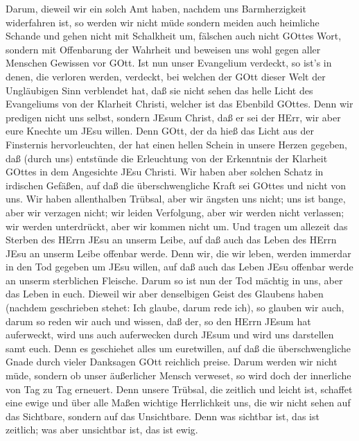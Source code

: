  Darum, dieweil wir ein solch Amt haben, nachdem uns
Barmherzigkeit widerfahren ist, so werden wir nicht müde 
sondern meiden auch heimliche Schande und gehen nicht mit Schalkheit um,
fälschen auch nicht GOttes Wort, sondern mit Offenbarung der Wahrheit
und beweisen uns wohl gegen aller Menschen Gewissen vor GOtt.
 Ist nun unser Evangelium verdeckt, so ist's in denen, die
verloren werden, verdeckt,  bei welchen der GOtt dieser Welt
der Ungläubigen Sinn verblendet hat, daß sie nicht sehen das helle Licht
des Evangeliums von der Klarheit Christi, welcher ist das Ebenbild
GOttes.  Denn wir predigen nicht uns selbst, sondern JEsum
Christ, daß er sei der HErr, wir aber eure Knechte um JEsu willen.
 Denn GOtt, der da hieß das Licht aus der Finsternis
hervorleuchten, der hat einen hellen Schein in unsere Herzen gegeben,
daß (durch uns) entstünde die Erleuchtung von der Erkenntnis der
Klarheit GOttes in dem Angesichte JEsu Christi.  Wir haben
aber solchen Schatz in irdischen Gefäßen, auf daß die überschwengliche
Kraft sei GOttes und nicht von uns.  Wir haben allenthalben
Trübsal, aber wir ängsten uns nicht; uns ist bange, aber wir verzagen
nicht;  wir leiden Verfolgung, aber wir werden nicht
verlassen; wir werden unterdrückt, aber wir kommen nicht um.
 Und tragen um allezeit das Sterben des HErrn JEsu an
unserm Leibe, auf daß auch das Leben des HErrn JEsu an unserm Leibe
offenbar werde.  Denn wir, die wir leben, werden immerdar
in den Tod gegeben um JEsu willen, auf daß auch das Leben JEsu offenbar
werde an unserm sterblichen Fleische.  Darum so ist nun der
Tod mächtig in uns, aber das Leben in euch.  Dieweil wir
aber denselbigen Geist des Glaubens haben (nachdem geschrieben stehet:
Ich glaube, darum rede ich), so glauben wir auch, darum so reden wir
auch  und wissen, daß der, so den HErrn JEsum hat
auferweckt, wird uns auch auferwecken durch JEsum und wird uns
darstellen samt euch.  Denn es geschiehet alles um
euretwillen, auf daß die überschwengliche Gnade durch vieler Danksagen
GOtt reichlich preise.  Darum werden wir nicht müde,
sondern ob unser äußerlicher Mensch verweset, so wird doch der
innerliche von Tag zu Tag erneuert.  Denn unsere Trübsal,
die zeitlich und leicht ist, schaffet eine ewige und über alle Maßen
wichtige Herrlichkeit  uns, die wir nicht sehen auf das
Sichtbare, sondern auf das Unsichtbare. Denn was sichtbar ist, das ist
zeitlich; was aber unsichtbar ist, das ist ewig.

